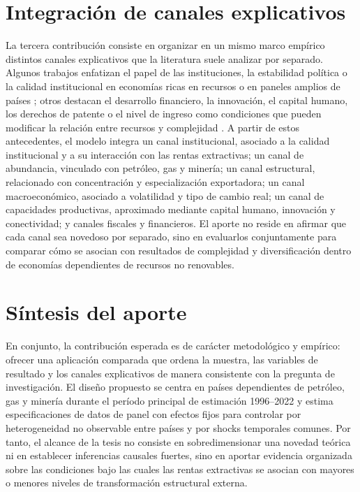 \documentclass[../../PTFM.tex]{subfiles}
\begin{document}
	\section{Integración de canales explicativos}
	\label{sec:contribucion-canales}

	La tercera contribución consiste en organizar en un mismo marco empírico distintos canales explicativos que la literatura suele analizar por separado. Algunos trabajos enfatizan el papel de las instituciones, la estabilidad política o la calidad institucional en economías ricas en recursos o en paneles amplios de países \parencite{Ajide2022,Avom2022,AvomNdoya2024,Olaniyi-Odhiambo2025,Olaniyi-Odhiambo2025-3,Owjimehr2024}; otros destacan el desarrollo financiero, la innovación, el capital humano, los derechos de patente o el nivel de ingreso como condiciones que pueden modificar la relación entre recursos y complejidad \parencite{Alvarado2023,Li2024,Mayer2023,Sweet2019,Valentine2024,YaseminYalta2021}. A partir de estos antecedentes, el modelo integra un canal institucional, asociado a la calidad institucional y a su interacción con las rentas extractivas; un canal de abundancia, vinculado con petróleo, gas y minería; un canal estructural, relacionado con concentración y especialización exportadora; un canal macroeconómico, asociado a volatilidad y tipo de cambio real; un canal de capacidades productivas, aproximado mediante capital humano, innovación y conectividad; y canales fiscales y financieros. El aporte no reside en afirmar que cada canal sea novedoso por separado, sino en evaluarlos conjuntamente para comparar cómo se asocian con resultados de complejidad y diversificación dentro de economías dependientes de recursos no renovables.

	\section*{Síntesis del aporte}

	En conjunto, la contribución esperada es de carácter metodológico y empírico: ofrecer una aplicación comparada que ordena la muestra, las variables de resultado y los canales explicativos de manera consistente con la pregunta de investigación. El diseño propuesto se centra en países dependientes de petróleo, gas y minería durante el período principal de estimación 1996--2022 y estima especificaciones de datos de panel con efectos fijos para controlar por heterogeneidad no observable entre países y por shocks temporales comunes. Por tanto, el alcance de la tesis no consiste en sobredimensionar una novedad teórica ni en establecer inferencias causales fuertes, sino en aportar evidencia organizada sobre las condiciones bajo las cuales las rentas extractivas se asocian con mayores o menores niveles de transformación estructural externa.
\end{document}
